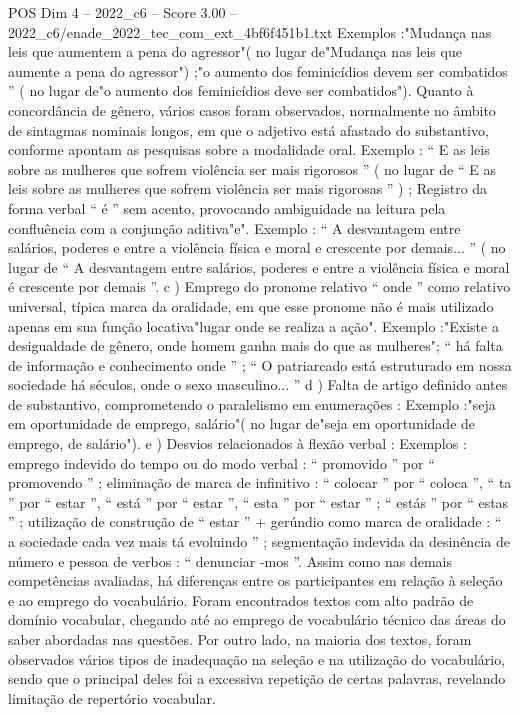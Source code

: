 \begin{textsample}{POS Dim 4 – 2022\_c6 – Score 3.00 – 2022\_c6/enade\_2022\_tec\_com\_ext\_4bf6f451b1.txt}
Exemplos :"Mudança nas leis que aumentem a pena do agressor"( no lugar de"Mudança nas leis que aumente a pena do agressor") ;"o aumento dos feminicídios devem ser combatidos ” ( no lugar de"o aumento dos feminicídios deve ser combatidos").
Quanto à concordância de gênero, vários casos foram observados, normalmente no âmbito de sintagmas nominais longos, em que o adjetivo está afastado do substantivo, conforme apontam as pesquisas sobre a modalidade oral.
Exemplo : “ E as leis sobre as mulheres que sofrem violência ser mais rigorosos ” ( no lugar de “ E as leis sobre as mulheres que sofrem violência ser mais rigorosas ” ) ; Registro da forma verbal “ é ” sem acento, provocando ambiguidade na leitura pela confluência com a conjunção aditiva"e".
Exemplo : “ A desvantagem entre salários, poderes e entre a violência física e moral e crescente por demais... ” ( no lugar de “ A desvantagem entre salários, poderes e entre a violência física e moral é crescente por demais ”. c ) Emprego do pronome relativo “ onde ” como relativo universal, típica marca da oralidade, em que esse pronome não é mais utilizado apenas em sua função locativa"lugar onde se realiza a ação".
Exemplo :"Existe a desigualdade de gênero, onde homem ganha mais do que as mulheres"; “ há falta de informação e conhecimento onde ” ; “ O patriarcado está estruturado em nossa sociedade há séculos, onde o sexo masculino... ” d ) Falta de artigo definido antes de substantivo, comprometendo o paralelismo em enumerações : Exemplo :"seja em oportunidade de emprego, salário"( no lugar de"seja em oportunidade de emprego, de salário"). e ) Desvios relacionados à flexão verbal : Exemplos : emprego indevido do tempo ou do modo verbal : “ promovido ” por “ promovendo ” ; eliminação de marca de infinitivo : “ colocar ” por “ coloca ”, “ ta ” por “ estar ”, “ está ” por “ estar ”, “ esta ” por “ estar ” ; “ estás ” por “ estas ” ; utilização de construção de “ estar ” + gerúndio como marca de oralidade : “ a sociedade cada vez mais tá evoluindo ” ; segmentação indevida da desinência de número e pessoa de verbos : “ denunciar -mos ”.
Assim como nas demais competências avaliadas, há diferenças entre os participantes em relação à seleção e ao emprego do vocabulário.
Foram encontrados textos com alto padrão de domínio vocabular, chegando até ao emprego de vocabulário técnico das áreas do saber abordadas nas questões.
Por outro lado, na maioria dos textos, foram observados vários tipos de inadequação na seleção e na utilização do vocabulário, sendo que o principal deles foi a excessiva repetição de certas palavras, revelando limitação de repertório vocabular.

\end{textsample}
